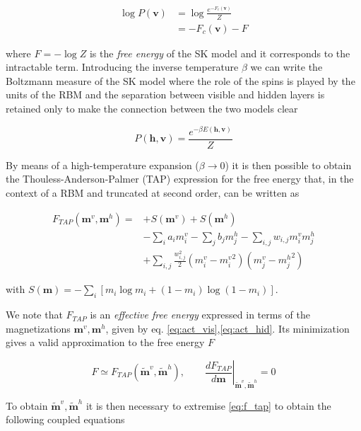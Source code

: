 \documentclass[notitlepage]{revtex4-1}
\begin{document}
\begin{align}
\log P(\mathbf{v}) &= \log \frac{e^{-F_c(\mathbf{v})}}{Z} \\ \nonumber
&= -F_c(\mathbf{v}) - F
\end{align}

where \( \textstyle F = - \log Z \) is the \textit{free energy} of the SK model and it corresponds to the intractable term. Introducing the inverse temperature \(\beta\) we can write the Boltzmann measure of the SK model where the role of the spins is played by the units of the RBM and the separation between visible and hidden layers is retained only to make the connection between the two models clear

\begin{equation}
P(\textbf{h},\textbf{v}) = \frac{e^{- \beta E(\textbf{h},\textbf{v})}}{Z}
\end{equation}

By means of a high-temperature expansion (\(\beta \to 0\)) \cite{ht_exp} it is then possible to obtain the Thouless-Anderson-Palmer (TAP) expression for the free energy \cite{TAP} that, in the context of a RBM and truncated at second order, can be written as

\begin{align}
F_{TAP}(\mathbf{m}^v,\mathbf{m}^h) = &+ S(\mathbf{m}^v) + S(\mathbf{m}^h) \nonumber \\
&- \sum_i a_i m_i^v - \sum_j b_j m_j^h - \sum_{i,j} w_{i,j} m_i^v m_j^h \nonumber \\
&+ \sum_{i,j} \frac{w_{i,j}^2}{2} \left( m_i^v - {m_i^v}^2 \right) \left(m_j^v - {m_j^h}^2 \right) \label{eq:f_tap}
\end{align}

with \( \textstyle S(\mathbf{m}) = - \sum_i \left[ m_i \log m_i + (1 - m_i) \log (1 - m_i) \right] \).

We note that \(F_{TAP}\) is an \textit{effective free energy} expressed in terms of the magnetizations \(\mathbf{m}^v, \mathbf{m}^h\), given by eq. \eqref{eq:act_vis},\eqref{eq:act_hid}. Its minimization gives a valid approximation to the free energy \(F\)

\begin{equation}
F \simeq F_{TAP}(\mathbf{\tilde{m}}^v, \mathbf{\tilde{m}}^h), \qquad \left. \frac{dF_{TAP}}{d \mathbf{m}} \right\rvert_{\mathbf{\tilde{m}}^v, \mathbf{\tilde{m}}^h} = 0
\label{eq:f_approx}
\end{equation}

To obtain \(\mathbf{\tilde{m}}^v, \mathbf{\tilde{m}}^h\) it is then necessary to extremise \eqref{eq:f_tap} to obtain the following coupled equations
\end{document}
